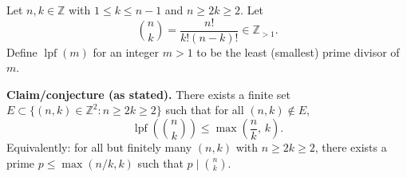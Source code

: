 \smallskip
\noindent
Let $n,k\in\mathbb{Z}$ with $1\le k\le n-1$ and $n\ge 2k\ge 2$. Let
\[
\binom{n}{k}=\frac{n!}{k!(n-k)!}\in\mathbb{Z}_{>1}.
\]
Define $\operatorname{lpf}(m)$ for an integer $m>1$ to be the least (smallest) prime divisor of $m$.

\smallskip
\noindent
\textbf{Claim/conjecture (as stated).}
There exists a finite set $E\subset\{(n,k)\in\mathbb{Z}^2: n\ge 2k\ge 2\}$ such that for all $(n,k)\notin E$,
\[
\operatorname{lpf}\!\left(\binom{n}{k}\right)\le \max\left(\frac{n}{k},\,k\right).
\]
Equivalently: for all but finitely many $(n,k)$ with $n\ge 2k\ge 2$, there exists a prime $p\le \max(n/k,k)$ such that $p\mid\binom{n}{k}$.
